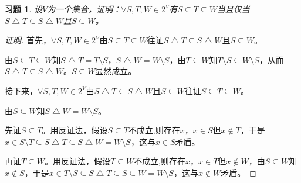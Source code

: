 \documentclass{article}
\begin{document}
\begin{CJK}{UTF8}{gbsn}
\newtheorem*{Ex}{习题}
\begin{Ex}
  设$V$为一个集合，证明：$\forall S,T,W \in 2^V$有$S \subseteq T \subseteq W$当且仅当$S \bigtriangleup T \subseteq S \bigtriangleup W$且$S \subseteq W$。
\end{Ex}

\begin{proof}[证明]
  首先，$\forall S,T,W \in 2^V$由$S \subseteq T \subseteq W$往证$S \bigtriangleup T \subseteq S \bigtriangleup W$且$S \subseteq W$。

  由$S \subseteq T \subseteq W$知$S \bigtriangleup T = T\setminus S$，$S \bigtriangleup W = W\setminus S$，由$T\subseteq W$知$T\setminus S \subseteq W\setminus S$，从而$S \bigtriangleup T \subseteq S \bigtriangleup W$。$S \subseteq W$显然成立。

  接下来，$\forall S,T,W \in 2^V$由$S \bigtriangleup T \subseteq S \bigtriangleup W$且$S \subseteq W$往证$S \subseteq T \subseteq W$。

  由$S\subseteq W$知$S\bigtriangleup W = W\setminus S$。
  
  先证$S\subseteq T$。用反证法，假设$S\subseteq T$不成立,则存在$x$，$x\in S$但$x \notin T$，于是$x\in S\setminus T\subseteq S\bigtriangleup T \subseteq S\bigtriangleup W = W\setminus S$，这与$x\in S$矛盾。

  再证$T\subseteq W$。用反证法，假设$T\subseteq W$不成立,则存在$x$，$x\in T$但$x \notin W$，由$S\subseteq W$知$x\notin S$，于是$x \in T\setminus S \subseteq S\bigtriangleup T \subseteq S\subseteq W = W\setminus S$，这与$x\notin W$矛盾。
\end{proof}
\end{CJK}
\end{document}
